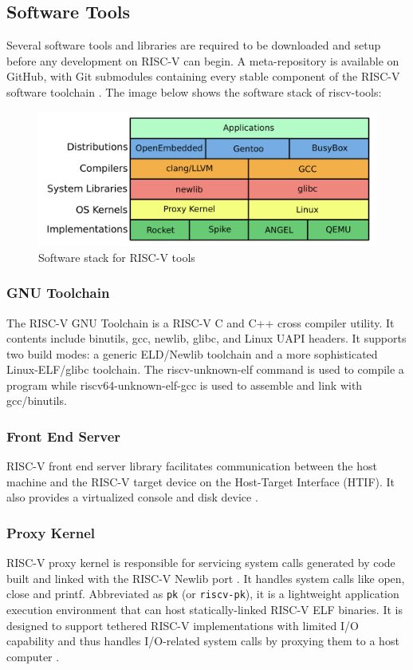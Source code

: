 \subsection{Software Tools}
 \label{sect6_2_1}
Several software tools and libraries are required to be downloaded and setup before any development on RISC-V can begin. A meta-repository is available on GitHub, with Git submodules containing every stable component of the RISC-V software toolchain \cite{riscv_tools_bootcamp}. The image below shows the software stack of riscv-tools: 
\begin{figure}[h!]
\centering
\includegraphics[width=\linewidth]{figures/RISC-V_Software_Stack.png}
\caption{Software stack for RISC-V tools \cite{riscv_tools_bootcamp}}
\label{fig:riscv2}
\end{figure}

\subsubsection{GNU Toolchain}
 \label{sect6_2_1_1}
The RISC-V GNU Toolchain is a RISC-V C and C++ cross compiler utility. It contents include binutils, gcc, newlib, glibc, and Linux UAPI headers. It supports two build modes: a generic ELD/Newlib toolchain and a more sophisticated Linux-ELF/glibc toolchain. The riscv-unknown-elf command is used to compile a program while riscv64-unknown-elf-gcc is used to assemble and link with gcc/binutils.

\subsubsection{Front End Server}
 \label{sect6_2_1_2}
RISC-V front end server library facilitates communication between the host machine and the RISC-V target device on the Host-Target Interface (HTIF). It also provides a virtualized console and disk device \cite{riscv_soft_tools}. 

\subsubsection{Proxy Kernel}
 \label{sect6_2_1_3}
RISC-V proxy kernel is responsible for servicing system calls generated by code built and linked with the RISC-V Newlib port \cite{riscv_soft_tools}. It handles system calls like open, close and printf. Abbreviated as \verb|pk| (or \verb|riscv-pk|), it is a lightweight application execution environment that can host statically-linked RISC-V ELF binaries. It is designed to support tethered RISC-V implementations with limited I/O capability and thus handles I/O-related system calls by proxying them to a host computer \cite{riscv_pk}.

